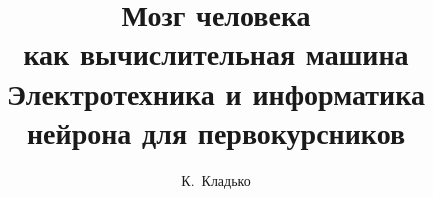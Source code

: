 \documentclass[11pt,openany]{book}
\title{\Huge Мозг человека\\[6pt] \huge как вычислительная машина\\[14pt] \Large Электротехника и информатика нейрона для первокурсников}
\author{\Large К.~Кладько}
\date{}
\theoremstyle{remark}
\begin{document}
\frontmatter
\maketitle

\tableofcontents
\mainmatter























\appendix
\renewcommand{\chaptername}{\appendixname}



\end{document}

